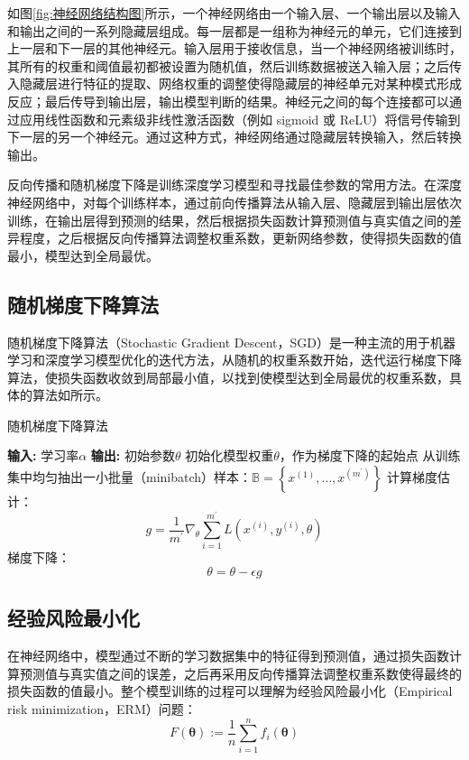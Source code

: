 如图\ref{fig:神经网络结构图}所示，一个神经网络由一个输入层、一个输出层以及输入和输出之间的一系列隐藏层组成。每一层都是一组称为神经元的单元，它们连接到上一层和下一层的其他神经元。输入层用于接收信息，当一个神经网络被训练时，其所有的权重和阈值最初都被设置为随机值，然后训练数据被送入输入层；之后传入隐藏层进行特征的提取、网络权重的调整使得隐藏层的神经单元对某种模式形成反应；最后传导到输出层，输出模型判断的结果。神经元之间的每个连接都可以通过应用线性函数和元素级非线性激活函数（例如 sigmoid 或 ReLU）将信号传输到下一层的另一个神经元。通过这种方式，神经网络通过隐藏层转换输入，然后转换输出。

反向传播和随机梯度下降是训练深度学习模型和寻找最佳参数的常用方法。在深度神经网络中，对每个训练样本，通过前向传播算法从输入层、隐藏层到输出层依次训练，在输出层得到预测的结果，然后根据损失函数计算预测值与真实值之间的差异程度，之后根据反向传播算法调整权重系数，更新网络参数，使得损失函数的值最小，模型达到全局最优。

\subsection{随机梯度下降算法}
随机梯度下降算法（Stochastic Gradient Descent，SGD）是一种主流的用于机器学习和深度学习模型优化的迭代方法，从随机的权重系数开始，迭代运行梯度下降算法，使损失函数收敛到局部最小值，以找到使模型达到全局最优的权重系数，具体的算法如所示。

\begin{algorithm}[!htb]
	\caption{随机梯度下降算法}
	\label{随机梯度下降算法}
	\begin{algorithmic}[1]
		\footnotesize
		\STATE \textbf{输入:} 学习率$\alpha$
		\STATE \textbf{输出:} 初始参数$\theta$
		\STATE 初始化模型权重$\theta$，作为梯度下降的起始点
		\STATE 从训练集中均匀抽出一小批量（minibatch）样本：$\mathbb{B}=\left\{x^{(1)}, \ldots, x^{\left(m^{\prime}\right)}\right\}$
		\STATE 计算梯度估计：$$
g=\frac{1}{m^{\prime}} \nabla_{\theta} \sum_{i=1}^{m^{\prime}} L\left(x^{(i)}, y^{(i)}, \theta\right)
$$
		\STATE 梯度下降：$$
\theta=\theta-\epsilon g
$$
		\ENDWHILE
	\end{algorithmic}
\end{algorithm}

\subsection{经验风险最小化}
在神经网络中，模型通过不断的学习数据集中的特征得到预测值，通过损失函数计算预测值与真实值之间的误差，之后再采用反向传播算法调整权重系数使得最终的损失函数的值最小。整个模型训练的过程可以理解为经验风险最小化（Empirical risk minimization，ERM）问题：
\begin{equation}\label{eq:ERM}
F(\boldsymbol{\theta}):=\frac{1}{n} \sum_{i=1}^{n} f_{i}(\boldsymbol{\theta})
\end{equation}

